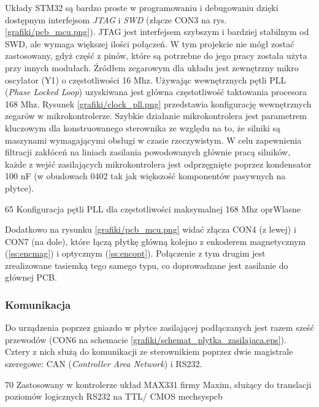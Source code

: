Układy STM32 są bardzo proste w programowaniu i debugowaniu dzięki dostępnym interfejsom {\it JTAG} i {\it SWD} (złącze CON3 na rys. \ref{grafiki/pcb_mcu.png}). JTAG jest interfejsem szybszym i bardziej stabilnym od SWD, ale wymaga większej ilości połączeń. W tym projekcie nie mógł zostać zastosowany, gdyż część z pinów, które są potrzebne do jego pracy została użyta przy innych modułach. Źródłem zegarowym dla układu jest zewnętrzny mikro oscylator (Y1) o częstotliwości 16 Mhz. Używając wewnętrznych pętli PLL ({\it Phase Locked Loop}) uzyskiwana jest główna częstotliwość taktowania procesora 168 Mhz. Rysunek \ref{grafiki/clock_pll.png} przedstawia konfigurację wewnętrznych zegarów w mikrokontrolerze. Szybkie działanie mikrokontrolera jest parametrem kluczowym dla konstruowanego sterownika ze względu na to, że silniki są maszynami wymagającymi obsługi w czasie rzeczywistym. W celu zapewnienia filtracji zakłóceń na liniach zasilania powodowanych głównie pracą silników, każde z wejść zasilających mikrokontrolera jest odprzęgnięte poprzez kondensator 100 nF (w obudowach 0402 tak jak większość komponentów pasywnych na płytce). 

	{65}
	{Konfiguracja pętli PLL dla częstotliwości maksymalnej 168 Mhz}
	{oprWlasne}

Dodatkowo na rysunku \ref{grafiki/pcb_mcu.png} widać złącza CON4 (z lewej) i CON7 (na dole), które łączą płytkę główną kolejno z enkoderem magnetycznym (\ref{ss:encmag}) i optycznym (\ref{ss:encopt}). Połączenie z tym drugim jest zrealizowane tasiemką tego samego typu, co doprowadzane jest zasilanie do głównej PCB.

\subsubsection{Komunikacja}
\label{sss:hardware_komunikacja}

Do urządzenia poprzez gniazdo w płytce zasilającej podłączanych jest razem sześć przewodów (CON6 na schemacie \ref{grafiki/schemat_plytka_zasilajaca.eps}). Cztery z nich służą do komunikacji ze sterownikiem poprzez dwie magistrale szeregowe: CAN ({\it Controller Area Network}) \linebreak i RS232.

	{70}
	{Zastosowany w kontrolerze układ MAX331 firmy Maxim, służący do translacji poziomów logicznych RS232 na TTL/ CMOS}
	{mechsyspcb}

